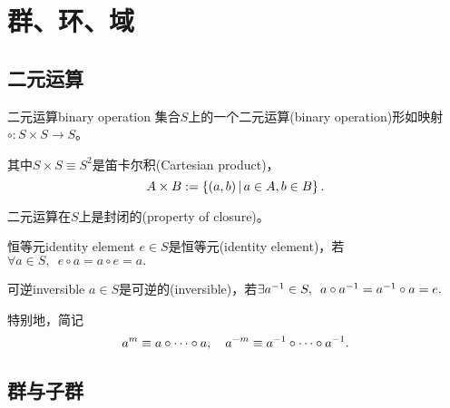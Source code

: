 \chapter{群、环、域}

\section{二元运算}

\begin{definition}{二元运算}{binary operation}
	集合$S$上的一个二元运算(binary operation)形如映射$\circ:S\times S\to S$。

	其中$S\times S\equiv S^2$是笛卡尔积(Cartesian product)，
	\[
		A\times B:=\left\{(a,b)\,\middle\vert\,a\in A, b\in B\right\}.
	\]
\end{definition}
二元运算在$S$上是封闭的(property of closure)。
\begin{definition}{恒等元}{identity element}
	$e\in S$是恒等元(identity element)，若$\forall a\in S,\enspace e\circ a=a\circ e=a.$
\end{definition}
\begin{definition}{可逆}{inversible}
	$a\in S$是可逆的(inversible)，若$\exists a^{-1}\in S,\enspace a\circ a^{-1}=a^{-1}\circ a=e.$
\end{definition}
特别地，简记
\[
	a^m\equiv a\circ\cdots\circ a,\quad a^{-m}\equiv a^{-1}\circ\cdots\circ a^{-1}.
\]

\section{群与子群}

